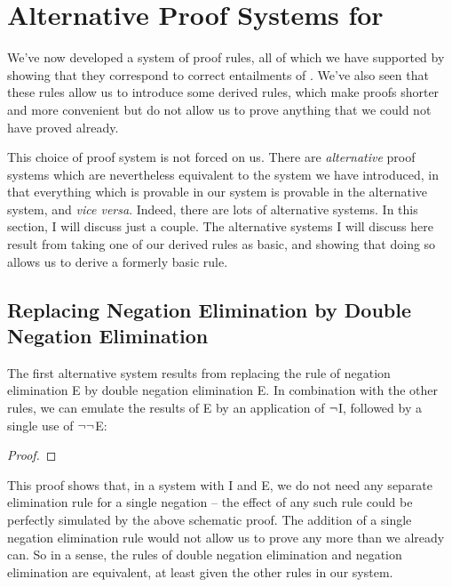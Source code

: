 \chapter{Alternative Proof Systems for \textnormal{\TFL}}\label{s:alternates}

We've now developed a system of proof rules, all of which we have supported by showing that they correspond to correct entailments of \TFL. We've also seen that these rules allow us to introduce some derived rules, which make proofs shorter and more convenient but do not allow us to prove anything that we could not have proved already.

This choice of proof system is not forced on us. There are \emph{alternative} proof systems which are nevertheless equivalent to the system we have introduced, in that everything which is provable in our system is provable in the alternative system, and \emph{vice versa}. Indeed, there are lots of alternative systems. In this section, I will discuss just a couple. The alternative systems I will discuss here result from taking one of our derived rules as basic, and showing that doing so allows us to derive a formerly basic rule.

\section{Replacing Negation Elimination by Double Negation Elimination} 

The first alternative system results from replacing the rule of negation elimination {\enot}E by double negation elimination {\enot\enot}E. In combination with the other rules, we can emulate the results of {\enot}E by an application of $\neg$I, followed by a single use of $\neg\neg$E:
 \begin{proof}
	\open 
	\have[\ ]{}{\vdots}
	\have[\ ]{}{\vdots}
	\close
	 
\end{proof}
This proof shows that, in a system with {\enot}I and {\enot\enot}E, we do not need any separate elimination rule for a single negation – the effect of any such rule could be perfectly simulated by the above schematic proof. The addition of a single negation elimination rule would not allow us to prove any more than we already can. So in a sense, the rules of double negation elimination and negation elimination are equivalent, at least given the other rules in our system.

